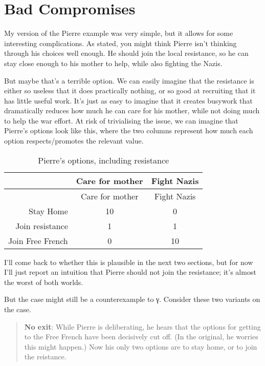 \documentclass[
  11pt,
  letterpaper,
  DIV=11,
  numbers=noendperiod,
  twoside]{scrartcl}
\begin{document}
\section{Bad Compromises}\label{sec-badcomp}

My version of the Pierre example was very simple, but it allows for some
interesting complications. As stated, you might think Pierre isn't
thinking through his choices well enough. He should join the local
resistance, so he can stay close enough to his mother to help, while
also fighting the Nazis.

But maybe that's a terrible option. We can easily imagine that the
resistance is either so useless that it does practically nothing, or so
good at recruiting that it has little useful work. It's just as easy to
imagine that it creates busywork that dramatically reduces how much he
can care for his mother, while not doing much to help the war effort. At
risk of trivialising the issue, we can imagine that Pierre's options
look like this, where the two columns represent how much each option
respects/promotes the relevant value.

\begin{longtable}[]{@{}rcc@{}}
\caption{Pierre's options, including
resistance}\label{tbl-pierreresist}\tabularnewline
\toprule\noalign{}
& Care for mother & Fight Nazis \\
\midrule\noalign{}
\endfirsthead
\toprule\noalign{}
& Care for mother & Fight Nazis \\
\midrule\noalign{}
\endhead
\bottomrule\noalign{}
\endlastfoot
Stay Home & 10 & 0 \\
Join resistance & 1 & 1 \\
Join Free French & 0 & 10 \\
\end{longtable}

I'll come back to whether this is plausible in the next two sections,
but for now I'll just report an intuition that Pierre should not join
the resistance; it's almost the worst of both worlds.

But the case might still be a counterexample to γ. Consider these two
variants on the case.

\begin{quote}
\textbf{No exit}: While Pierre is deliberating, he hears that the
options for getting to the Free French have been decisively cut off. (In
the original, he worries this might happen.) Now his only two options
are to stay home, or to join the reistance.
\end{quote}
\end{document}
